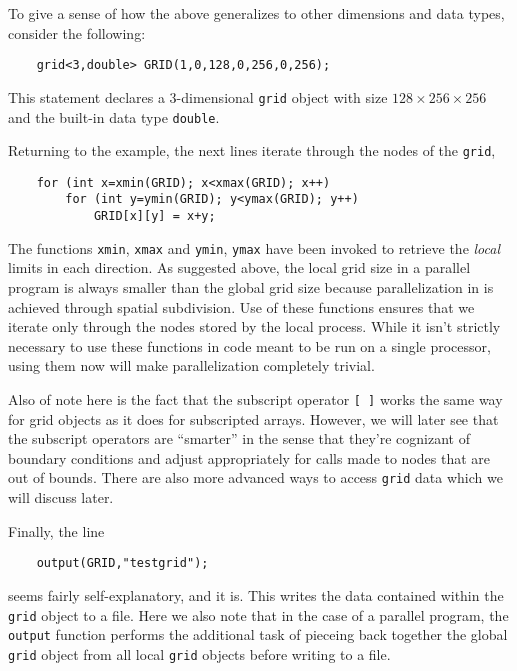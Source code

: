 To give a sense of how the above generalizes to other dimensions and data types, consider the following:
\begin{shadebox}
\begin{verbatim}
    grid<3,double> GRID(1,0,128,0,256,0,256);
\end{verbatim}
\end{shadebox}
This statement declares a 3-dimensional {\tt grid} object with size $128\times256\times256$ and the built-in data type {\tt double}.

Returning to the example, the next lines iterate through the nodes of the {\tt grid},
\begin{shadebox}
\begin{verbatim}
    for (int x=xmin(GRID); x<xmax(GRID); x++)
        for (int y=ymin(GRID); y<ymax(GRID); y++)
            GRID[x][y] = x+y;
\end{verbatim}
\end{shadebox}
The functions {\tt xmin}, {\tt xmax} and {\tt ymin}, {\tt ymax} have been invoked to retrieve the {\em local} limits in each direction.  As suggested above, the local grid size in a parallel program is always smaller than the global grid size because parallelization in \MMSP is achieved through spatial subdivision.  Use of these functions ensures that we iterate only through the nodes stored by the local process.  While it isn't strictly necessary to use these functions in code meant to be run on a single processor, using them now will make parallelization completely trivial.

Also of note here is the fact that the subscript operator {\tt [ ]} works the same way for \MMSP grid objects as it does for subscripted arrays.  However, we will later see that the \MMSP subscript operators are ``smarter'' in the sense that they're cognizant of boundary conditions and adjust appropriately for calls made to nodes that are out of bounds.  There are also more advanced ways to access {\tt grid} data which we will discuss later.

Finally, the line 
\begin{shadebox}
\begin{verbatim}
    output(GRID,"testgrid");
\end{verbatim}
\end{shadebox}
seems fairly self-explanatory, and it is.  This writes the data contained within the {\tt grid} object to a file.  Here we also note that in the case of a parallel program, the {\tt output} function performs the additional task of pieceing back together the global {\tt grid} object from all local {\tt grid} objects before writing to a file.

